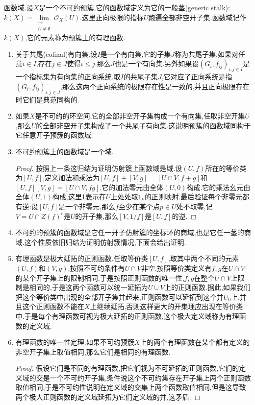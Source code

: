 函数域.设$X$是一个不可约预簇,它的函数域定义为它的一般茎(generic stalk):$k(X)=\lim\limits_{\substack{\rightarrow\\U\not=\emptyset}}\mathscr{O}_X(U)$.这里正向极限的指标$U$跑遍全部非空开子集.函数域记作$k(X)$,它的元素称为预簇上的有理函数.
\begin{enumerate}
	\item 关于共尾(cofinal)有向集.设$I$是一个有向集,它的子集$J$称为共尾子集,如果对任意$i\in I$,存在$j\in J$使得$i\le j$.那么$J$也是一个有向集.另外如果设$(G_i,f_{ij})_{i,j\in I}$是一个指标集为有向集的正向系统.取$I$的共尾子集$J$,它对应了正向系统是指$(G_i,f_{ij})_{i,j\in J}$,那么这两个正向系统的极限存在性是一致的,并且正向极限存在时它们是典范同构的.
	\item 如果$X$是不可约的环空间,它的全部非空开子集构成一个有向集,任取非空开集$U$,那么$U$的全部非空开子集构成了一个共尾子有向集.这说明预簇的函数域同构于它任意开子预簇的函数域.
	\item 不可约预簇上的函数域是一个域.
	\begin{proof}
		
		按照上一条这归结为证明仿射簇上函数域是域.设$(U,f)$所在的等价类为$[U,f]$,定义加法和乘法为$[U,f]+[V,g]=[U\cap V,f+g]$和$[U,f][V,g]=[U\cap V,fg]$.它的加法零元由全体$(U,0)$构成.它的乘法幺元由全体$(U,1)$构成,这里1表示在$U$上处处取$1_k$的正则映射.最后验证每个非零元都有逆:设$[U,f]$是一个非零元,那么$f$至少在某个点$p\in U$处不取零,记$V=U\cap Z(f)^c$是$U$的开子集,那么$[V,1/f]$是$[U,f]$的逆.
	\end{proof}
	\item 不可约的预簇的函数域是它任一开子仿射簇的坐标环的商域,也是它任一茎的商域.这个性质依旧归结为证明仿射簇情况,下面会给出证明.
	\item 有理函数是极大延拓的正则函数.任取等价类$[U,f]$,取其中两个不同的元素$(U,f)$和$(V,g)$,按照不可约条件有$U\cap V$非空,按照等价类定义有$f,g$在$U\cap V$的某个开子集上的限制相同,于是按照正则函数的唯一性,$f,g$在整个$U\cap V$上限制是相同的,于是这两个函数可以统一延拓为$U\cup V$上的正则函数.据此,如果我们把这个等价类中出现的全部开子集并起来,正则函数可以延拓到这个并$U_0$上.并且这个正则函数不能在$X$上继续延拓,否则这样更大的开集理应出现在等价类中.于是每个有理函数可视为极大延拓的正则函数,这个极大定义域称为有理函数的定义域.
	\item 有理函数的唯一性定理.如果不可约预簇$X$上的两个有理函数在某个都有定义的非空开子集上取值相同,那么它们是相同的有理函数.
	\begin{proof}
		
		假设它们是不同的有理函数,把它们视为不可延拓的正则函数,它们的定义域的交是一个不可约开子集,条件说这个不可约集存在开子集上两个正则函数取值相同,于是不可约性说明在定义域的交集上两个函数取值相同,但是这导致两个极大正则函数的定义域延拓为它们定义域的并,这矛盾.
	\end{proof}
\end{enumerate}


